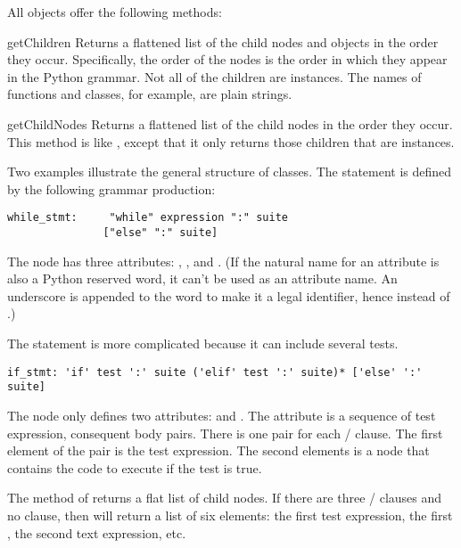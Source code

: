 All  objects offer the following methods:

\begin{methoddesc}{getChildren}{}
  Returns a flattened list of the child nodes and objects in the
  order they occur.  Specifically, the order of the nodes is the
  order in which they appear in the Python grammar.  Not all of the
  children are  instances.  The names of functions and
  classes, for example, are plain strings.
\end{methoddesc}

\begin{methoddesc}{getChildNodes}{}
  Returns a flattened list of the child nodes in the order they
  occur.  This method is like , except that it
  only returns those children that are  instances.
\end{methoddesc}

Two examples illustrate the general structure of 
classes.  The  statement is defined by the following
grammar production: 

\begin{verbatim}
while_stmt:     "while" expression ":" suite
               ["else" ":" suite]
\end{verbatim}

The  node has three attributes: ,
, and .  (If the natural name for an
attribute is also a Python reserved word, it can't be used as an
attribute name.  An underscore is appended to the word to make it a
legal identifier, hence  instead of .)

The  statement is more complicated because it can include
several tests.  

\begin{verbatim}
if_stmt: 'if' test ':' suite ('elif' test ':' suite)* ['else' ':' suite]
\end{verbatim}

The  node only defines two attributes:  and
.  The  attribute is a sequence of test
expression, consequent body pairs.  There is one pair for each
/ clause.  The first element of the pair is
the test expression.  The second elements is a  node that
contains the code to execute if the test is true.

The  method of  returns a flat list of
child nodes.  If there are three / clauses
and no  clause, then  will return
a list of six elements: the first test expression, the first
, the second text expression, etc.

